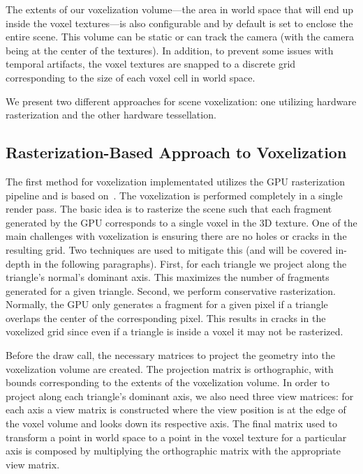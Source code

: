 The extents of our voxelization volume---the area in world space that will end up inside the voxel textures---is also configurable and by default is set to enclose the entire scene. This volume can be static or can track the camera (with the camera being at the center of the textures). In addition, to prevent some issues with temporal artifacts, the voxel textures are snapped to a discrete grid corresponding to the size of each voxel cell in world space.

We present two different approaches for scene voxelization: one utilizing hardware rasterization and the other hardware tessellation.

\subsection{Rasterization-Based Approach to Voxelization}
The first method for voxelization implementated utilizes the GPU rasterization pipeline and is based on~\cite{crassin2012octree}. The voxelization is performed completely in a single render pass. The basic idea is to rasterize the scene such that each fragment generated by the GPU corresponds to a single voxel in the 3D texture.
One of the main challenges with voxelization is ensuring there are no holes or cracks in the resulting grid. Two techniques are used to mitigate this (and will be covered in-depth in the following paragraphs). First, for each triangle we project along the triangle's normal's dominant axis. This maximizes the number of fragments generated for a given triangle. Second, we perform conservative rasterization. Normally, the GPU only generates a fragment for a given pixel if a triangle overlaps the center of the corresponding pixel. This results in cracks in the voxelized grid since even if a triangle is inside a voxel it may not be rasterized.

Before the draw call, the necessary matrices to project the geometry into the voxelization volume are created. The projection matrix is orthographic, with bounds corresponding to the extents of the voxelization volume. In order to project along each triangle's dominant axis, we also need three view matrices: for each axis a view matrix is constructed where the view position is at the edge of the voxel volume and looks down its respective axis. The final matrix used to transform a point in world space to a point in the voxel texture for a particular axis is composed by multiplying the orthographic matrix with the appropriate view matrix.

